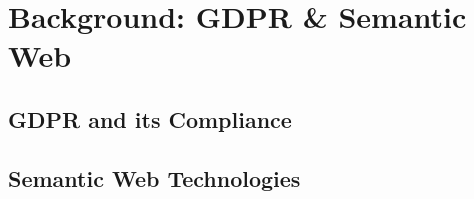 \chapter{Background: GDPR \& Semantic Web}
\label{chapter:background}

\section{GDPR and its Compliance}\label{sec:background:GDPR}

\section{Semantic Web Technologies}\label{sec:background:semweb}